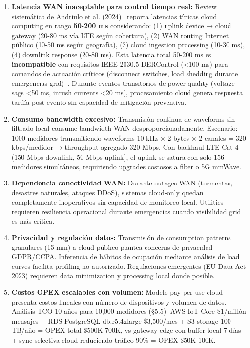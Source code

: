 \begin{enumerate}
\item \textbf{Latencia WAN inaceptable para control tiempo real:} Review sistemático de Andriulo et al. (2024)~\cite{andriuloEdgeComputingCloud2024} reporta latencias típicas cloud computing en rango \textbf{50-200 ms} considerando: (1) uplink device → cloud gateway (20-80 ms vía LTE según cobertura), (2) WAN routing Internet público (10-50 ms según geografía), (3) cloud ingestion processing (10-30 ms), (4) downlink response (20-80 ms). Esta latencia total 50-200 ms es \textbf{incompatible} con requisitos IEEE 2030.5 DERControl (<100 ms) para comandos de actuación críticos (disconnect switches, load shedding durante emergencias grid)~\cite{IEEERecommendedPractice}. Durante eventos transitorios de power quality (voltage sags <50 ms, inrush currents <20 ms), procesamiento cloud genera respuesta tardía post-evento sin capacidad de mitigación preventiva.

\item \textbf{Consumo bandwidth excesivo:} Transmisión continua de waveforms sin filtrado local consume bandwidth WAN desproporcionadamente. Escenario: 1000 medidores transmitiendo waveforms 10 kHz $\times$ 2 bytes $\times$ 2 canales = 320 kbps/medidor → throughput agregado 320 Mbps. Con backhaul LTE Cat-4 (150 Mbps downlink, 50 Mbps uplink), el uplink se satura con solo 156 medidores simultáneos, requiriendo upgrades costosos a fiber o 5G mmWave.

\item \textbf{Dependencia conectividad WAN:} Durante outages WAN (tormentas, desastres naturales, ataques DDoS), sistemas cloud-only quedan completamente inoperativos sin capacidad de monitoreo local. Utilities requieren resiliencia operacional durante emergencias cuando visibilidad grid es más crítica.

\item \textbf{Privacidad y regulación datos:} Transmisión de consumption patterns granulares (15 min) a cloud público plantea concerns de privacidad GDPR/CCPA. Inferencia de hábitos de ocupación mediante análisis de load curves facilita profiling no autorizado. Regulaciones emergentes (EU Data Act 2023) requieren data minimization y processing local donde posible.

\item \textbf{Costos OPEX escalables con volumen:} Modelo pay-per-use cloud presenta costos lineales con número de dispositivos y volumen de datos. Análisis TCO 10 años para 10,000 medidores (§5.5): AWS IoT Core \$1/millón mensajes + RDS PostgreSQL db.r5.4xlarge \$3,500/mes + S3 storage 100 TB/año = OPEX total \$500K-700K, vs gateway edge con buffer local 7 días + sync selectiva cloud reduciendo tráfico 90\% = OPEX \$50K-100K.
\end{enumerate}

